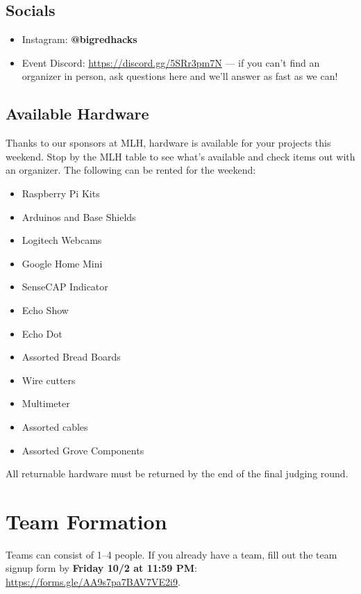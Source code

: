 \documentclass[11pt]{article}
\newcommand{\important}[1]{\textbf{\color{bigred}#1}}
\begin{document}
\subsection*{Socials}
\begin{itemize}
  \item Instagram: \textbf{@bigredhacks}
  \item Event Discord: \url{https://discord.gg/5SRr3pm7N} --- if you can't find
        an organizer in person, ask questions here and we'll answer as fast as we can!
\end{itemize}

\subsection*{Available Hardware}
Thanks to our sponsors at MLH, hardware is available for your projects this
weekend. Stop by the MLH table to see what's available and check items out with
an organizer. The following can be rented for the weekend:

\begin{minipage}[t]{0.48\textwidth}
\begin{itemize}
  \item Raspberry Pi Kits
  \item Arduinos and Base Shields
  \item Logitech Webcams
  \item Google Home Mini
  \item SenseCAP Indicator
  \item Echo Show
\end{itemize}
\end{minipage}\hfill
\begin{minipage}[t]{0.48\textwidth}
\begin{itemize}
  \item Echo Dot
  \item Assorted Bread Boards
  \item Wire cutters
  \item Multimeter
  \item Assorted cables
  \item Assorted Grove Components
\end{itemize}
\end{minipage}

\medskip
All returnable hardware must be returned by the end of the final judging round.

\section{Team Formation}
Teams can consist of 1--4 people. If you already have a team, fill out the team
signup form by \important{Friday 10/2 at 11:59 PM}:
\url{https://forms.gle/AA9s7pa7BAV7VE2i9}.
\end{document}

